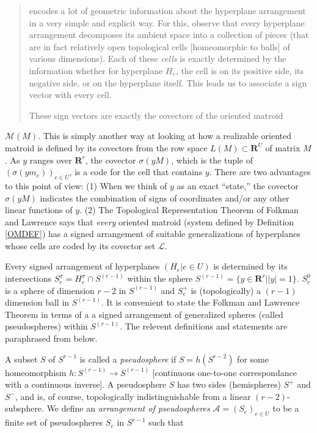\documentclass{amsproc-sunycstr}
\def\Reals{\ensuremath{\mathbf R}}
\theoremstyle{plain}
\theoremstyle{definition}
\theoremstyle{remark}
\begin{document}
\begin{quote}
encodes a lot of geometric information about the hyperplane arrangement in 
a very simple and explicit way.  For this, observe that every hyperplane
arrangement decomposes its ambient space into a collection of pieces
(that are in fact relatively open topological cells [homeomorphic to balls]
of various dimensions).  Each of these \textit{cells} is exactly determined
by the information whether for hyperplane $H_e$, the cell is on its positive
side, its negative side, or on the hyperplane itself.  This leads us to 
associate a sign vector with every cell.

These sign vectors are exactly the covectors of the oriented matroid
\end{quote}
$\mathcal{M}(M)$.  
This is simply another way at looking at how a realizable oriented matroid is 
defined by its covectors from the row space $L(M)\subset\Reals^U$ of 
matrix $M$.  As $y$ ranges over $\Reals^r$, the covector $\sigma(yM)$,
which is the tuple of $(\sigma(ym_e))_{e\in U}$, is a code for the cell
that contains $y$.  There are two advantages to this point of view:
(1) When we think of $y$ as an exact ``state,'' the covector
$\sigma(yM)$ indicates the combination of signs of coordinates and/or 
any other linear functions of $y$.  (2) The Topological Representation
Theorem of Folkman and Lawrence says that \textit{every} oriented matroid
(system defined by Definition \ref{OMDEF}) has a signed arrangement of 
suitable generalizations of hyperplanes whose cells 
are coded by its covector
set $\mathcal{L}$.  

Every signed arrangement of hyperplanes $(H_e|e\in U)$ is determined by its
intersections $S_e^\sigma =H_e^\sigma \cap S^{(r-1)}$ within the sphere 
$S^{(r-1)}=\{y\in\Reals^r| |y|=1\}$.  $S_e^0$ is a sphere of dimension $r-2$ 
in $S^{(r-1)}$ and $S_e^+$ is (topologically) a $(r-1)$ dimension ball in
$S^{(r-1)}$.  It is convenient to 
state the Folkman and Lawrence Theorem in terms of a 
a signed arrangement of generalized spheres (called pseudospheres) within
$S^{(r-1)}$.  The relevent definitions and statements are 
paraphrased from
\cite{OMBOOK} below.  

A subset $S$ of $S^{r-1}$ is called a \textit{pseudosphere} if $S=h(S^{r-2})$ 
for some homeomorphism $h:S^{(r-1)}\rightarrow S^{(r-1)}$ 
[continuous one-to-one correspondance with a continuous inverse].  A 
pseudosphere $S$ has two sides (hemispheres) $S^+$ and $S^-$, and is, of
course, topologically indistinguishable from a linear $(r-2)$-subsphere.
We define an \textit{arrangement of pseudospheres} 
$\mathcal{A}=(S_e)_{e\in U}$ to be a finite set of pseudospheres
$S_e$ in $S^{r-1}$ such that 
\end{document}
